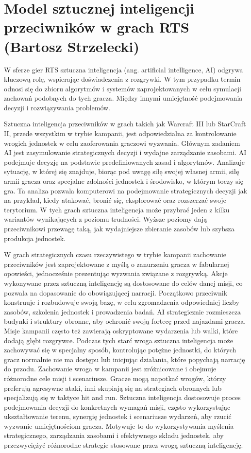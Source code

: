 \section{Model sztucznej inteligencji przeciwników w grach RTS (Bartosz Strzelecki)}
W sferze gier RTS sztuczna inteligencja (ang. artificial intelligence, AI) odgrywa kluczową rolę, wspierając doświadczenia z rozgrywki.
W tym przypadku termin odnosi się do zbioru algorytmów i systemów zaprojektowanych w celu symulacji
zachowań podobnych do tych gracza. Między innymi umiejętność podejmowania decyzji i rozwiązywania problemów.

Sztuczna inteligencja przeciwników w grach takich jak Warcraft III lub StarCraft II, przede wszystkim w trybie kampanii,
jest odpowiedzialna za kontrolowanie wrogich jednostek w celu zaoferowania graczowi wyzwania. Głównym zadaniem AI jest zasymulowanie
strategicznych decyzji i wydajne zarządzanie zasobami.
AI podejmuje decyzję na podstawie predefiniowanych zasad i algorytmów. Analizuje sytuację, w której się znajduje, biorąc pod uwagę
siłę swojej własnej armii, siłę armii gracza oraz specjalne zdolności jednostek i środowisko, w którym toczy się gra.
Ta analiza pozwala komputerowi na podejmowanie strategicznych decyzji jak na przykład, kiedy atakować, bronić się, eksplorować oraz rozszerzać swoje terytorium.
W tych grach sztuczna inteligencja może przybrać jeden z kilku wariantów wynikających z poziomu trudności. Wyższe poziomy
dają przeciwnikowi przewagę taką, jak wydajniejsze zbieranie zasobów lub szybsza produkcja jednostek.

W grach strategicznych czasu rzeczywistego w trybie kampanii zachowanie przeciwników jest zaprojektowane z myślą o zanurzeniu gracza w fabularnej opowieści, jednocześnie
prezentując wyzwania związane z rozgrywką. Akcje wykonywane przez sztuczną inteligencję są dostosowane do celów danej misji, co pozwala
na dopasowanie do obowiązującej narracji.
Początkowo przeciwnik konstruuje i rozbudowuje swoją bazę, w celu zgromadzenia odpowiedniej liczby zasobów, szkolenia jednostek i prowadzenia badań.
AI strategicznie rozmieszcza budynki i struktury obronne, aby ochronić swoją fortecę przed najazdami gracza. 
Misje kampanii często też zawierają oskryptowane wydarzenia lub walki, które dodają głębi rozgrywce. Podczas tych starć wroga sztuczna inteligencja
może zachowywać się w specjalny sposób, kontrolując potężne jednostki, do których gracz normalnie nie ma dostępu lub inicjując działania, które popychają
narrację do przodu.
Zachowanie wroga w kampanii jest zróżnicowane i obejmuje różnorodne cele misji i scenariusze. Gracze mogą napotkać wrogów, którzy preferują agresywne ataki,
inni skupiają się na strategiach obronnych lub specjalizują się w taktyce hit and run. Sztuczna inteligencja dostosowuje proces podejmowania decyzji do
konkretnych wymagań misji, często wykorzystując ukształtowanie terenu, synergię jednostek i scenariusze wydarzeń, aby rzucić wyzwanie umiejętnościom gracza.
Motywuje to do wykorzystywania myślenia strategicznego, zarządzania zasobami i efektywnego składu jednostek, aby przezwyciężyć różnorodne strategie stosowane przez wrogą sztuczną inteligencję.

